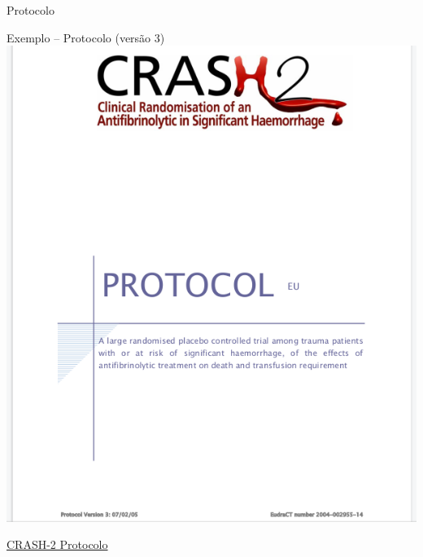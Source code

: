 \documentclass{beamer}
\begin{document}
\begin{frame}{Protocolo}
  \begin{exampleblock}{Exemplo -- Protocolo (versão 3)}
    \centering
    \includegraphics[height=.8\textheight]{Planejamento/CRASH-proto1}

  \end{exampleblock}
  \vfill
  \scriptsize
  \hfill \href{http://www.crash2.lshtm.ac.uk/Protocol_Eng.html}{CRASH-2 Protocolo}
\end{frame}
\end{document}
